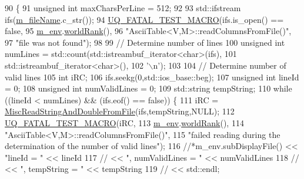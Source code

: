 \begin{DoxyCode}
90 \{
91   \textcolor{keywordtype}{unsigned} \textcolor{keywordtype}{int} maxCharsPerLine = 512;
92 
93   std::ifstream ifs(\hyperlink{class_q_u_e_s_o_1_1_ascii_table_adb7e4bac907ef1c93d745f02ea9f15d2}{m\_fileName}.c\_str());
94   \hyperlink{_defines_8h_a56d63d18d0a6d45757de47fcc06f574d}{UQ\_FATAL\_TEST\_MACRO}(ifs.is\_open() == \textcolor{keyword}{false},
95                       \hyperlink{class_q_u_e_s_o_1_1_ascii_table_a2ba907db652aa02d53d493980d7a3753}{m\_env}.\hyperlink{class_q_u_e_s_o_1_1_base_environment_a78b57112bbd0e6dd0e8afec00b40ffa7}{worldRank}(),
96                       \textcolor{stringliteral}{"AsciiTable<V,M>::readColumnsFromFile()"},
97                       \textcolor{stringliteral}{"file was not found"});
98 
99   \textcolor{comment}{// Determine number of lines}
100   \textcolor{keywordtype}{unsigned} \textcolor{keywordtype}{int} numLines = std::count(std::istreambuf\_iterator<char>(ifs),
101                                      std::istreambuf\_iterator<char>(),
102                                      \textcolor{charliteral}{'\(\backslash\)n'});
103 
104   \textcolor{comment}{// Determine number of valid lines}
105   \textcolor{keywordtype}{int} iRC;
106   ifs.seekg(0,std::ios\_base::beg);
107   \textcolor{keywordtype}{unsigned} \textcolor{keywordtype}{int} lineId = 0;
108   \textcolor{keywordtype}{unsigned} \textcolor{keywordtype}{int} numValidLines = 0;
109   std::string tempString;
110   \textcolor{keywordflow}{while} ((lineId < numLines) && (ifs.eof() == \textcolor{keyword}{false})) \{
111     iRC = \hyperlink{namespace_q_u_e_s_o_af0fc61c58d0ca592fa172eeab540d39c}{MiscReadStringAndDoubleFromFile}(ifs,tempString,NULL);
112     \hyperlink{_defines_8h_a56d63d18d0a6d45757de47fcc06f574d}{UQ\_FATAL\_TEST\_MACRO}(iRC,
113                         \hyperlink{class_q_u_e_s_o_1_1_ascii_table_a2ba907db652aa02d53d493980d7a3753}{m\_env}.\hyperlink{class_q_u_e_s_o_1_1_base_environment_a78b57112bbd0e6dd0e8afec00b40ffa7}{worldRank}(),
114                         \textcolor{stringliteral}{"AsciiTable<V,M>::readColumnsFromFile()"},
115                         \textcolor{stringliteral}{"failed reading during the determination of the number of valid lines"});
116     \textcolor{comment}{//*m\_env.subDisplayFile() << "lineId = "          << lineId}
117     \textcolor{comment}{//                        << ", numValidLines = " << numValidLines}
118     \textcolor{comment}{//                        << ", tempString = "    << tempString}
119     \textcolor{comment}{//                        << std::endl;}

\end{DoxyCode}
